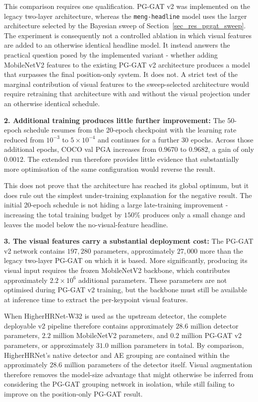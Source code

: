This comparison requires one qualification.
PG-GAT v2 was implemented on the legacy two-layer architecture,
whereas the \texttt{meng-headline} model uses the larger architecture
selected by the Bayesian sweep of Section~\ref{sec_res_pggat_sweep}.
The experiment is consequently not a controlled ablation in which
visual features are added to an otherwise identical headline model.
It instead answers the practical question posed by the implemented
variant -
whether adding MobileNetV2 features to the existing PG-GAT v2
architecture produces a model that surpasses the final position-only system.
It does not.
A strict test of the marginal contribution of visual features to the
sweep-selected architecture would require retraining that architecture
with and without the visual projection under an otherwise identical
schedule.

\textbf{2. Additional training produces little further improvement:}
The 50-epoch schedule resumes from the 20-epoch checkpoint with the
learning rate reduced from $10^{-3}$ to $5\times10^{-4}$
and continues for a further 30 epochs.
Across those additional epochs,
COCO val PGA increases from $0.9670$ to $0.9682$,
a gain of only $0.0012$.
The extended run therefore provides little evidence that substantially
more optimisation of the same configuration would reverse the result.

This does not prove that the architecture has reached its global
optimum,
but it does rule out the simplest under-training explanation for the
negative result.
The initial 20-epoch schedule is not hiding a large late-training
improvement -
increasing the total training budget by $150\%$ produces only a small
change and leaves the model below the no-visual-feature headline.

\textbf{3. The visual features carry a substantial deployment cost:}
The PG-GAT v2 network contains $197{,}280$ parameters,
approximately $27{,}000$ more than the legacy two-layer PG-GAT
on which it is based.
More significantly, producing its visual input requires the frozen
MobileNetV2 backbone,
which contributes approximately $2.2\times10^{6}$ additional parameters.
These parameters are not optimised during PG-GAT v2 training,
but the backbone must still be available at inference time to extract
the per-keypoint visual features.

When HigherHRNet-W32 is used as the upstream detector,
the complete deployable v2 pipeline therefore contains approximately
$28.6$ million detector parameters,
$2.2$ million MobileNetV2 parameters,
and $0.2$ million PG-GAT v2 parameters,
or approximately $31.0$ million parameters in total.
By comparison, HigherHRNet's native detector and AE grouping are
contained within the approximately $28.6$ million parameters of the
detector itself.
Visual augmentation therefore removes the model-size advantage that
might otherwise be inferred from considering the PG-GAT grouping
network in isolation,
while still failing to improve on the position-only PG-GAT result.


